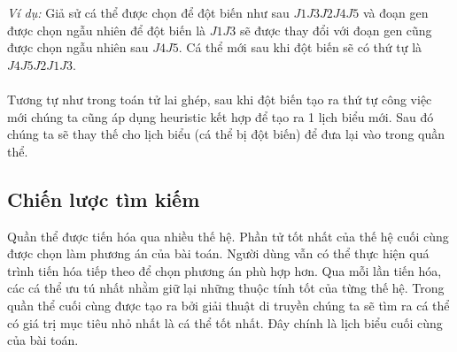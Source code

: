 \documentclass[a4paper,12pt]{article}
\begin{document}
\begin{itemize}
\textit{Ví dụ:} Giả sử cá thể được chọn để đột biến như sau $J1 J3 J2 J4 J5$ và đoạn gen được chọn ngẫu nhiên để đột biến là $J1 J3$ sẽ được thay đổi với đoạn gen cũng được chọn ngẫu nhiên sau $J4 J5$. Cá thể mới sau khi đột biến sẽ có thứ tự là $J4 J5 J2 J1 J3$.\\\\
Tương tự như trong toán tử lai ghép, sau khi đột biến tạo ra thứ tự công việc mới chúng ta cũng áp dụng heuristic kết hợp để tạo ra 1 lịch biểu mới. Sau đó chúng ta sẽ thay thế cho lịch biểu (cá thể bị đột biến) để đưa lại vào trong quần thể.
\end{itemize}
\subsection{Chiến lược tìm kiếm}
Quần thể được tiến hóa qua nhiều thế hệ. Phần tử tốt nhất của thế hệ cuối cùng được chọn làm phương án của bài toán. Người dùng vẫn có thể thực hiện quá trình tiến hóa tiếp theo để chọn phương án phù hợp hơn. Qua mỗi lần tiến hóa, các cá thể ưu tú nhất nhằm giữ lại những thuộc tính tốt của từng thế hệ. Trong quần thể cuối cùng được tạo ra bởi giải thuật di truyền chúng ta sẽ tìm ra cá thể có giá trị mục tiêu nhỏ nhất là cá thể tốt nhất. Đây chính là lịch biểu cuối cùng của bài toán.
\end{document}
